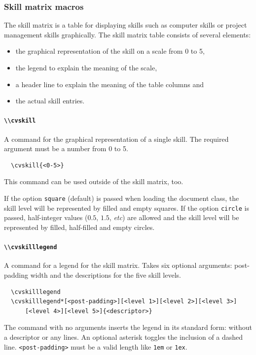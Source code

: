 \documentclass[a4paper, 11pt]{article}
\newcommand{\code}[1]{\lstinline!#1!}
\begin{document}
\subsubsection{Skill matrix macros}
The skill matrix is a table for displaying skills such as computer skills or project management skills graphically.
The skill matrix table consists of several elements:
\begin{itemize}
  \item the graphical representation of the skill on a scale from 0 to 5,
  \item the legend to explain the meaning of the scale,
  \item a header line to explain the meaning of the table columns and
  \item the actual skill entries.
\end{itemize}

\paragraph{\code{\\cvskill}}
A command for the graphical representation of a single skill.
The required argument must be a number from 0 to 5.
\begin{lstlisting}
  \cvskill{<0-5>}
\end{lstlisting}
This command can be used outside of the skill matrix, too. 

If the option \code{square} (default) is passed when loading the document class, the skill level will be represented by filled and empty squares. If the option \code{circle} is passed, half-integer values ($0.5$, $1.5$, \emph{etc}) are allowed and the skill level will be represented by filled, half-filled and empty circles.

\paragraph{\code{\\cvskilllegend}}
A command for a legend for the skill matrix.
Takes six optional arguments: post-padding width and the descriptions for the five skill levels.
\begin{lstlisting}
  \cvskilllegend
  \cvskilllegend*[<post-padding>][<level 1>][<level 2>][<level 3>]
      [<level 4>][<level 5>]{<descriptor>}
\end{lstlisting}
The command with no arguments inserts the legend in its standard form: without a descriptor or any lines.
An optional asterisk toggles the inclusion of a dashed line.
\code{<post-padding>} must be a valid length like \code{1em} or \code{1ex}.
\end{document}
